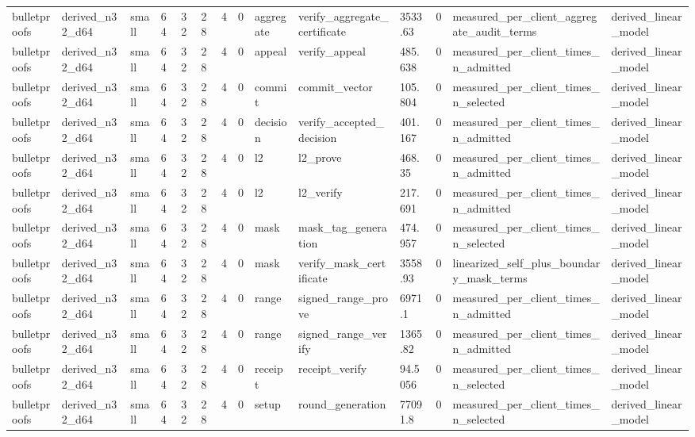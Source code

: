 \begin{table}[t]
\begin{tabular}{llllllllllllll}
bulletproofs & derived\_n32\_d64 & small & 64 & 32 & 28 & 4 & 0 & aggregate & verify\_aggregate\_certificate & 3533.63 & 0 & measured\_per\_client\_aggregate\_audit\_terms & derived\_linear\_model \\
bulletproofs & derived\_n32\_d64 & small & 64 & 32 & 28 & 4 & 0 & appeal & verify\_appeal & 485.638 & 0 & measured\_per\_client\_times\_n\_admitted & derived\_linear\_model \\
bulletproofs & derived\_n32\_d64 & small & 64 & 32 & 28 & 4 & 0 & commit & commit\_vector & 105.804 & 0 & measured\_per\_client\_times\_n\_selected & derived\_linear\_model \\
bulletproofs & derived\_n32\_d64 & small & 64 & 32 & 28 & 4 & 0 & decision & verify\_accepted\_decision & 401.167 & 0 & measured\_per\_client\_times\_n\_admitted & derived\_linear\_model \\
bulletproofs & derived\_n32\_d64 & small & 64 & 32 & 28 & 4 & 0 & l2 & l2\_prove & 468.35 & 0 & measured\_per\_client\_times\_n\_admitted & derived\_linear\_model \\
bulletproofs & derived\_n32\_d64 & small & 64 & 32 & 28 & 4 & 0 & l2 & l2\_verify & 217.691 & 0 & measured\_per\_client\_times\_n\_admitted & derived\_linear\_model \\
bulletproofs & derived\_n32\_d64 & small & 64 & 32 & 28 & 4 & 0 & mask & mask\_tag\_generation & 474.957 & 0 & measured\_per\_client\_times\_n\_selected & derived\_linear\_model \\
bulletproofs & derived\_n32\_d64 & small & 64 & 32 & 28 & 4 & 0 & mask & verify\_mask\_certificate & 3558.93 & 0 & linearized\_self\_plus\_boundary\_mask\_terms & derived\_linear\_model \\
bulletproofs & derived\_n32\_d64 & small & 64 & 32 & 28 & 4 & 0 & range & signed\_range\_prove & 6971.1 & 0 & measured\_per\_client\_times\_n\_admitted & derived\_linear\_model \\
bulletproofs & derived\_n32\_d64 & small & 64 & 32 & 28 & 4 & 0 & range & signed\_range\_verify & 1365.82 & 0 & measured\_per\_client\_times\_n\_admitted & derived\_linear\_model \\
bulletproofs & derived\_n32\_d64 & small & 64 & 32 & 28 & 4 & 0 & receipt & receipt\_verify & 94.5056 & 0 & measured\_per\_client\_times\_n\_selected & derived\_linear\_model \\
bulletproofs & derived\_n32\_d64 & small & 64 & 32 & 28 & 4 & 0 & setup & round\_generation & 77091.8 & 0 & measured\_per\_client\_times\_n\_selected & derived\_linear\_model \\

\end{tabular}
\end{table}
